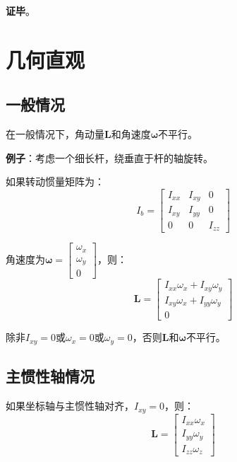 \documentclass[12pt,a4paper]{article}
\begin{document}
\textbf{证毕}。

\section{几何直观}

\subsection{一般情况}

在一般情况下，角动量$\bm{L}$和角速度$\bm{\omega}$不平行。

\textbf{例子}：考虑一个细长杆，绕垂直于杆的轴旋转。

如果转动惯量矩阵为：
\begin{equation}
I_b = \begin{bmatrix}
I_{xx} & I_{xy} & 0 \\
I_{xy} & I_{yy} & 0 \\
0 & 0 & I_{zz}
\end{bmatrix}
\end{equation}

角速度为$\bm{\omega} = \begin{bmatrix} \omega_x \\ \omega_y \\ 0 \end{bmatrix}$，则：
\begin{equation}
\bm{L} = \begin{bmatrix}
I_{xx} \omega_x + I_{xy} \omega_y \\
I_{xy} \omega_x + I_{yy} \omega_y \\
0
\end{bmatrix}
\end{equation}

除非$I_{xy} = 0$或$\omega_x = 0$或$\omega_y = 0$，否则$\bm{L}$和$\bm{\omega}$不平行。

\subsection{主惯性轴情况}

如果坐标轴与主惯性轴对齐，$I_{xy} = 0$，则：
\begin{equation}
\bm{L} = \begin{bmatrix}
I_{xx} \omega_x \\
I_{yy} \omega_y \\
I_{zz} \omega_z
\end{bmatrix}
\end{equation}
\end{document}
